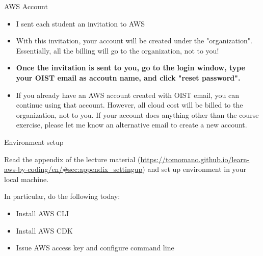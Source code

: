 \documentclass[unicode,11pt]{beamer}
\begin{document}


\begin{frame}{AWS Account}

\begin{itemize}
    \item I sent each student an invitation to AWS
    \item With this invitation, your account will be created under the "organization".
    Essentially, all the billing will go to the organization, not to you!
    \item \textbf{Once the invitation is sent to you, go to the login window, type your OIST email as accoutn name, and click "reset password".}
    \item If you already have an AWS account created with OIST email, you can continue using that account.
    However, all cloud cost will be billed to the organization, not to you.
    If your account does anything other than the course exercise, please let me know an alternative email to create a new account.
\end{itemize}

\end{frame}

\begin{frame}{Environment setup}

Read the appendix of the lecture material (\url{https://tomomano.github.io/learn-aws-by-coding/en/#sec:appendix_settingup}) and set up environment in your local machine.

In particular, do the following today:

\begin{itemize}
    \item Install AWS CLI
    \item Install AWS CDK
    \item Issue AWS access key and configure command line
\end{itemize}

\end{frame}
\end{document}
